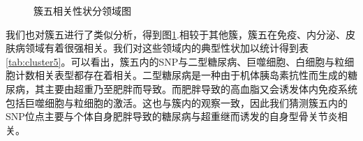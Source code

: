 \begin{figure}[htbp]
	\centering
	\caption{簇五相关性状分领域图}
	\label{fig:cluster5}
\end{figure}

我们也对簇五进行了类似分析，得到图\ref{fig:cluster5}.相较于其他簇，簇五在免疫、内分泌、皮肤病领域有着很强相关。我们对这些领域内的典型性状加以统计得到表\ref{tab:cluster5}。可以看出，簇五内的SNP与二型糖尿病、巨噬细胞、白细胞与粒细胞计数相关表型都存在着相关。二型糖尿病是一种由于机体胰岛素抗性而生成的糖尿病，其主要由超重乃至肥胖而导致。\cite{maruthur_diabetes_2016}而肥胖导致的高血脂又会诱发体内免疫系统包括巨噬细胞与粒细胞的激活。\cite{barrett_diabetes-mediated_2017}这也与簇内的观察一致，因此我们猜测簇五内的SNP位点主要与个体自身肥胖导致的糖尿病与超重继而诱发的自身型骨关节炎相关。

